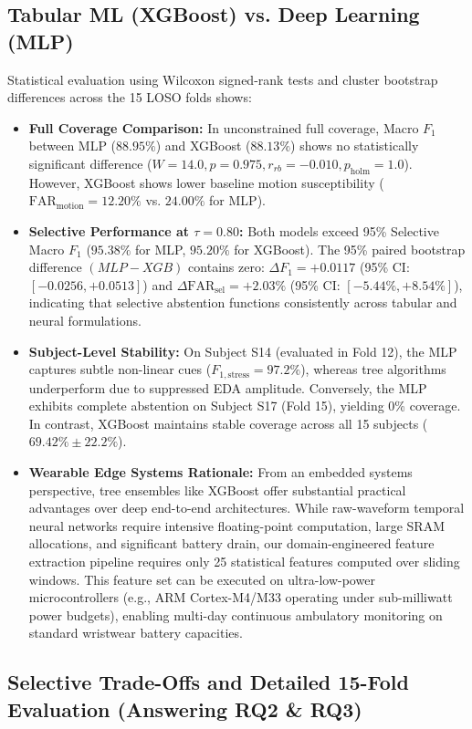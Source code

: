 \documentclass[conference]{IEEEtran}
\begin{document}
\subsection{Tabular ML (XGBoost) vs. Deep Learning (MLP)}
Statistical evaluation using Wilcoxon signed-rank tests and cluster bootstrap differences across the 15 LOSO folds shows:
\begin{itemize}
    \item \textbf{Full Coverage Comparison:} In unconstrained full coverage, Macro $F_1$ between MLP ($88.95\%$) and XGBoost ($88.13\%$) shows no statistically significant difference ($W = 14.0, p = 0.975, r_{rb} = -0.010, p_{\text{holm}} = 1.0$). However, XGBoost shows lower baseline motion susceptibility ($\text{FAR}_{\text{motion}} = 12.20\%$ vs. $24.00\%$ for MLP).
    \item \textbf{Selective Performance at $\tau = 0.80$:} Both models exceed 95\% Selective Macro $F_1$ ($95.38\%$ for MLP, $95.20\%$ for XGBoost). The 95\% paired bootstrap difference $(MLP - XGB)$ contains zero: $\Delta F_1 = +0.0117$ (95\% CI: $[-0.0256, +0.0513]$) and $\Delta \text{FAR}_{\text{sel}} = +2.03\%$ (95\% CI: $[-5.44\%, +8.54\%]$), indicating that selective abstention functions consistently across tabular and neural formulations.
    \item \textbf{Subject-Level Stability:} On Subject S14 (evaluated in Fold 12), the MLP captures subtle non-linear cues ($F_{1,\text{stress}} = 97.2\%$), whereas tree algorithms underperform due to suppressed EDA amplitude. Conversely, the MLP exhibits complete abstention on Subject S17 (Fold 15), yielding 0\% coverage. In contrast, XGBoost maintains stable coverage across all 15 subjects ($69.42\% \pm 22.2\%$).
    \item \textbf{Wearable Edge Systems Rationale:} From an embedded systems perspective, tree ensembles like XGBoost offer substantial practical advantages over deep end-to-end architectures. While raw-waveform temporal neural networks require intensive floating-point computation, large SRAM allocations, and significant battery drain, our domain-engineered feature extraction pipeline requires only 25 statistical features computed over sliding windows. This feature set can be executed on ultra-low-power microcontrollers (e.g., ARM Cortex-M4/M33 operating under sub-milliwatt power budgets), enabling multi-day continuous ambulatory monitoring on standard wristwear battery capacities.
\end{itemize}

\subsection{Selective Trade-Offs and Detailed 15-Fold Evaluation (Answering RQ2 \& RQ3)}
\end{document}

